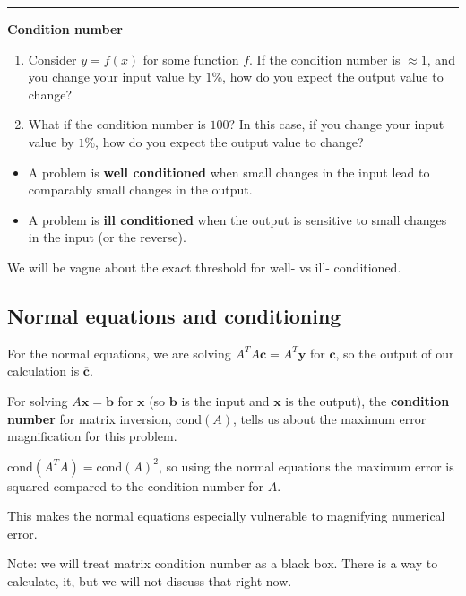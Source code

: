 \documentclass[12pt,letterpaper,noanswers]{exam}
\begin{document}
\vspace{0.2cm}
\hrule
\vspace{0.2cm}

\noindent \textbf{Condition number}
\begin{enumerate}[resume]
\item
Consider $y = f(x)$ for some function $f$.  If the condition number is $\approx 1$, and you change your input value by $1\%$, how do you expect the output value to change?

\vspace{0.5in}

\item
What if the condition number is $100$?  In this case, if you change your input value by $1\%$, how do you expect the output value to change?

\vspace{0.5in}
\end{enumerate}

\begin{tcolorbox}
\begin{itemize}
\itemsep0pt
\item A problem is \textbf{well conditioned} when small changes in the input lead to comparably small changes in the output.

\item A problem is \textbf{ill conditioned} when the output is sensitive to small changes in the input (or the reverse).
\end{itemize}

\end{tcolorbox}

We will be vague about the exact threshold for well- vs ill- conditioned.

\subsection{Normal equations and conditioning}

For the normal equations, we are solving $A^TA\overline{\mathbf{c}} = A^T\mathbf{y}$ for $\overline{\mathbf{c}}$, so the output of our calculation is $\overline{\mathbf{c}}$.

For solving $A\mathbf{x} = \mathbf{b}$ for $\mathbf{x}$ (so $\mathbf{b}$ is the input and $\mathbf{x}$ is the output), the \textbf{condition number} for matrix inversion, $\text{cond}(A)$, tells us about the maximum error magnification for this problem.

$\text{cond}(A^TA) = \text{cond}(A)^2$, so using the normal equations the maximum error is squared compared to the condition number for $A$.

This makes the normal equations especially vulnerable to magnifying numerical error.


Note: we will treat matrix condition number as a black box.  There is a way to calculate, it, but we will not discuss that right now.
\end{document}
